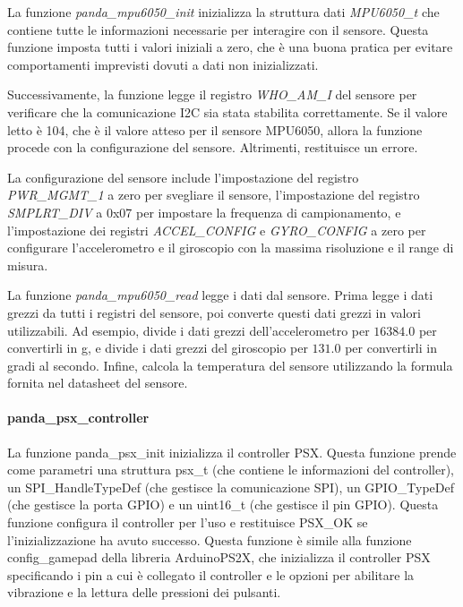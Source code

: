 \documentclass{article}
\begin{document}
          La funzione \textit{panda\_mpu6050\_init} inizializza la struttura dati \textit{MPU6050\_t} che contiene tutte le informazioni necessarie per interagire con il sensore. Questa funzione imposta tutti i valori iniziali a zero, che è una buona pratica per evitare comportamenti imprevisti dovuti a dati non inizializzati.
          
          Successivamente, la funzione legge il registro \textit{WHO\_AM\_I} del sensore per verificare che la comunicazione I2C sia stata stabilita correttamente. Se il valore letto è 104, che è il valore atteso per il sensore MPU6050, allora la funzione procede con la configurazione del sensore. Altrimenti, restituisce un errore.
          
          La configurazione del sensore include l’impostazione del registro \textit{PWR\_MGMT\_1} a zero per svegliare il sensore, l’impostazione del registro \textit{SMPLRT\_DIV} a 0x07 per impostare la frequenza di campionamento, e l’impostazione dei registri \textit{ACCEL\_CONFIG} e \textit{GYRO\_CONFIG} a zero per configurare l’accelerometro e il giroscopio con la massima risoluzione e il range di misura.
          
          La funzione \textit{panda\_mpu6050\_read} legge i dati dal sensore. Prima legge i dati grezzi da tutti i registri del sensore, poi converte questi dati grezzi in valori utilizzabili. Ad esempio, divide i dati grezzi dell’accelerometro per $16384.0$ per convertirli in g, e divide i dati grezzi del giroscopio per $131.0$ per convertirli in gradi al secondo. Infine, calcola la temperatura del sensore utilizzando la formula fornita nel datasheet del sensore.
          
          
          \paragraph{panda\_psx\_controller}
          La funzione panda\_psx\_init inizializza il controller PSX. Questa funzione prende come parametri una struttura psx\_t (che contiene le informazioni del controller), un SPI\_HandleTypeDef (che gestisce la comunicazione SPI), un GPIO\_TypeDef (che gestisce la porta GPIO) e un uint16\_t (che gestisce il pin GPIO). Questa funzione configura il controller per l’uso e restituisce PSX\_OK se l’inizializzazione ha avuto successo. Questa funzione è simile alla funzione config\_gamepad della libreria Arduino\-PS2X, che inizializza il controller PSX specificando i pin a cui è collegato il controller e le opzioni per abilitare la vibrazione e la lettura delle pressioni dei pulsanti.
\end{document}

